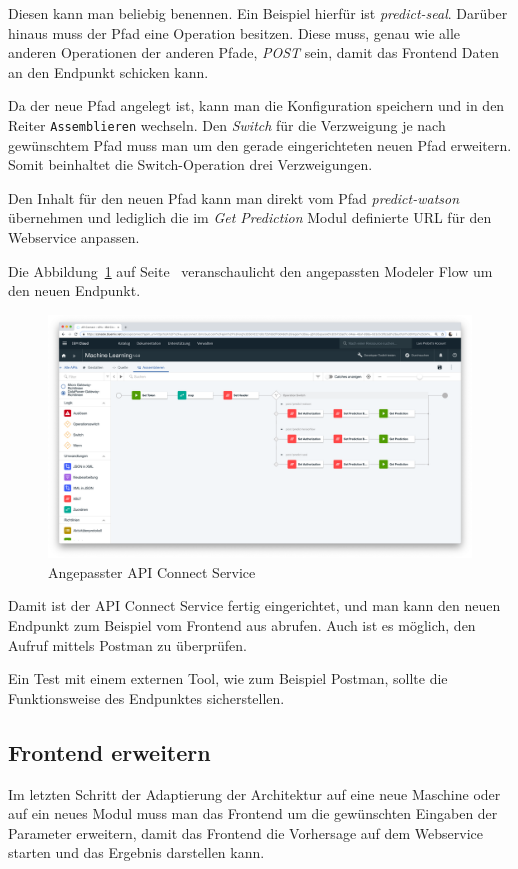 Diesen kann man beliebig benennen. Ein Beispiel hierfür ist \textit{predict-seal}. Darüber hinaus muss der Pfad eine
Operation besitzen. Diese muss, genau wie alle anderen Operationen der anderen Pfade, \textit{POST} sein, damit das
Frontend Daten an den Endpunkt schicken kann.

Da der neue Pfad angelegt ist, kann man die Konfiguration speichern und in den Reiter \texttt{Assemblieren} wechseln.
Den \textit{Switch} für die Verzweigung je nach gewünschtem Pfad muss man um den gerade eingerichteten neuen Pfad
erweitern. Somit beinhaltet die Switch-Operation drei Verzweigungen.

Den Inhalt für den neuen Pfad kann man direkt vom Pfad \textit{predict-watson} übernehmen und lediglich die im
\textit{Get Prediction} Modul definierte URL für den Webservice anpassen.

Die Abbildung~\ref{fig:siegelmaschinen_apiconnect} auf Seite~\pageref{fig:siegelmaschinen_apiconnect} veranschaulicht
den angepassten Modeler Flow um den neuen Endpunkt.

\begin{figure}[h]
    \centering
    \includegraphics[width=\textwidth]{images/kapitel_5/vffs_apiconnect.png}
    \caption{Angepasster API Connect Service}
    \label{fig:siegelmaschinen_apiconnect}
\end{figure}

Damit ist der API Connect Service fertig eingerichtet, und man kann den neuen Endpunkt zum Beispiel vom Frontend aus
abrufen. Auch ist es möglich, den Aufruf mittels Postman zu überprüfen.

Ein Test mit einem externen Tool, wie zum Beispiel Postman, sollte die Funktionsweise des Endpunktes sicherstellen.

\subsection{Frontend erweitern}
Im letzten Schritt der Adaptierung der Architektur auf eine neue Maschine oder auf ein neues Modul muss man das Frontend
um die gewünschten Eingaben der Parameter erweitern, damit das Frontend die Vorhersage auf dem Webservice starten und
das Ergebnis darstellen kann.

